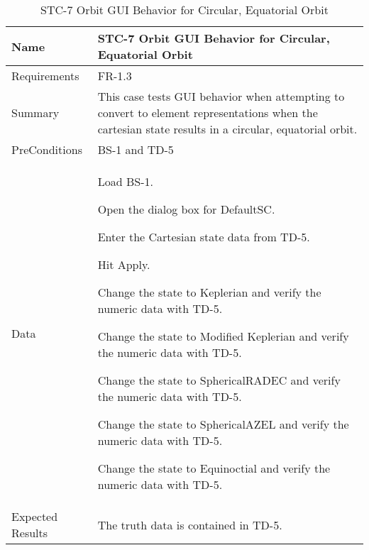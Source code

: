 

\begin{table}[htbp!]
\centering
      \begin{tabular}{|p{1.05 in} |p{4.75 in} |}
      \hline
         \rowcolor[rgb]{0.8,0.8,0.8} Name & STC-7 Orbit GUI Behavior for Circular, Equatorial Orbit\\
         \hline
         Requirements & FR-1.3\\  \hline
         Summary &
         This  case tests GUI behavior when attempting to convert to element representations when the
         cartesian state results in a circular, equatorial orbit.
         \\     \hline
         PreConditions & BS-1 and TD-5\\     \hline
         Data &
         \begin{compactenum}
             \item Load BS-1.
             \item Open the dialog box for DefaultSC.
             \item Enter the Cartesian state data from TD-5.
             \item Hit Apply.
             \item Change the state to Keplerian and verify the numeric data with TD-5.
             \item Change the state to Modified Keplerian and verify the numeric data with TD-5.
             \item Change the state to SphericalRADEC and verify the numeric data with TD-5.
             \item Change the state to SphericalAZEL and verify the numeric data with TD-5.
             \item Change the state to Equinoctial and verify the numeric data with TD-5.
         \end{compactenum}
         \\ \hline
         Expected Results & The truth data is contained in TD-5.\\
      \hline
      \end{tabular}
      \label{Table:STC-7}
      \caption{STC-7 Orbit GUI Behavior for Circular, Equatorial Orbit}
\end{table} 